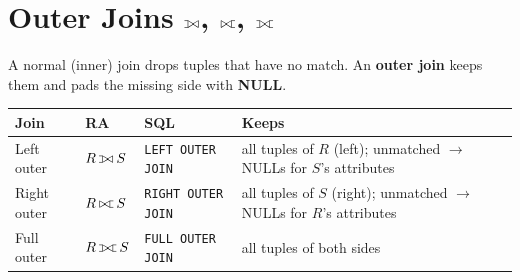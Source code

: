 \documentclass[10pt,a4paper]{article}
\def\ojoin{\setbox0=\hbox{$\bowtie$}\rule[-.02ex]{.25em}{.4pt}\llap{\rule[\ht0]{.25em}{.4pt}}}
\def\lojoin{\mathbin{\ojoin\mkern-5.8mu\bowtie}}
\def\rojoin{\mathbin{\bowtie\mkern-5.8mu\ojoin}}
\def\fojoin{\mathbin{\ojoin\mkern-5.8mu\bowtie\mkern-5.8mu\ojoin}}
\begin{document}
\section{Outer Joins $\lojoin$, $\rojoin$, $\fojoin$}

A normal (inner) join drops tuples that have no match. An \textbf{outer join} keeps them and pads the missing side with \textbf{NULL}.

\begin{tabularx}{\linewidth}{@{}l l l X@{}}
\toprule
\textbf{Join} & \textbf{RA} & \textbf{SQL} & \textbf{Keeps}\\\midrule
Left outer & $R \lojoin S$ & \texttt{LEFT OUTER JOIN} & all tuples of $R$ (left); unmatched $\to$ NULLs for $S$'s attributes\\
Right outer & $R \rojoin S$ & \texttt{RIGHT OUTER JOIN} & all tuples of $S$ (right); unmatched $\to$ NULLs for $R$'s attributes\\
Full outer & $R \fojoin S$ & \texttt{FULL OUTER JOIN} & all tuples of both sides\\
\bottomrule
\end{tabularx}
\end{document}
